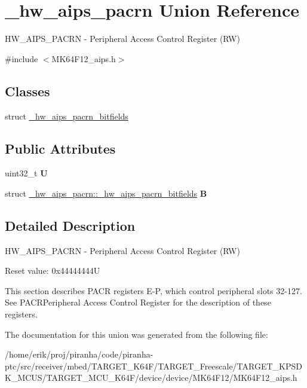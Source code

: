 \hypertarget{union__hw__aips__pacrn}{}\section{\+\_\+hw\+\_\+aips\+\_\+pacrn Union Reference}
\label{union__hw__aips__pacrn}


H\+W\+\_\+\+A\+I\+P\+S\+\_\+\+P\+A\+C\+RN -\/ Peripheral Access Control Register (RW)  




{\ttfamily \#include $<$M\+K64\+F12\+\_\+aips.\+h$>$}

\subsection*{Classes}
\begin{DoxyCompactItemize}
\item 
struct \hyperlink{struct__hw__aips__pacrn_1_1__hw__aips__pacrn__bitfields}{\+\_\+hw\+\_\+aips\+\_\+pacrn\+\_\+bitfields}
\end{DoxyCompactItemize}
\subsection*{Public Attributes}
\begin{DoxyCompactItemize}
\item 
uint32\+\_\+t {\bfseries U}\hypertarget{union__hw__aips__pacrn_a24cd1936a123103d4ca65863b6e4654a}{}\label{union__hw__aips__pacrn_a24cd1936a123103d4ca65863b6e4654a}

\item 
struct \hyperlink{struct__hw__aips__pacrn_1_1__hw__aips__pacrn__bitfields}{\+\_\+hw\+\_\+aips\+\_\+pacrn\+::\+\_\+hw\+\_\+aips\+\_\+pacrn\+\_\+bitfields} {\bfseries B}\hypertarget{union__hw__aips__pacrn_a6eee74d663c132fcc65fcbff632f9bef}{}\label{union__hw__aips__pacrn_a6eee74d663c132fcc65fcbff632f9bef}

\end{DoxyCompactItemize}


\subsection{Detailed Description}
H\+W\+\_\+\+A\+I\+P\+S\+\_\+\+P\+A\+C\+RN -\/ Peripheral Access Control Register (RW) 

Reset value\+: 0x44444444U

This section describes P\+A\+CR registers E-\/P, which control peripheral slots 32-\/127. See P\+A\+C\+R\+Peripheral Access Control Register for the description of these registers. 

The documentation for this union was generated from the following file\+:\begin{DoxyCompactItemize}
\item 
/home/erik/proj/piranha/code/piranha-\/ptc/src/receiver/mbed/\+T\+A\+R\+G\+E\+T\+\_\+\+K64\+F/\+T\+A\+R\+G\+E\+T\+\_\+\+Freescale/\+T\+A\+R\+G\+E\+T\+\_\+\+K\+P\+S\+D\+K\+\_\+\+M\+C\+U\+S/\+T\+A\+R\+G\+E\+T\+\_\+\+M\+C\+U\+\_\+\+K64\+F/device/device/\+M\+K64\+F12/M\+K64\+F12\+\_\+aips.\+h\end{DoxyCompactItemize}
